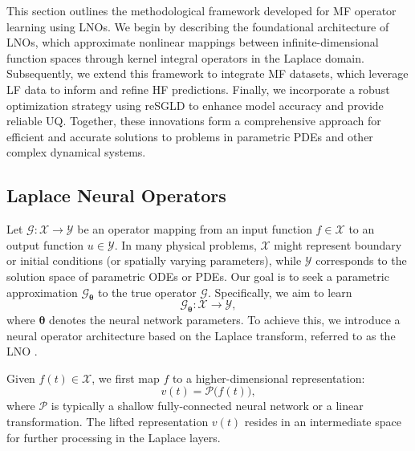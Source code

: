 
This section outlines the methodological framework developed for MF operator learning using LNOs. We begin by describing the foundational architecture of LNOs, which approximate nonlinear mappings between infinite-dimensional function spaces through kernel integral operators in the Laplace domain. Subsequently, we extend this framework to integrate MF datasets, which leverage LF data to inform and refine HF predictions. Finally, we incorporate a robust optimization strategy using reSGLD to enhance model accuracy and provide reliable UQ. Together, these innovations form a comprehensive approach for efficient and accurate solutions to problems in parametric PDEs and other complex dynamical systems.

\subsection{Laplace Neural Operators}\label{subsec:method_LNO}

Let $\mathcal{G}: \mathcal{X} \to \mathcal{Y}$ be an operator mapping from an input function $f\in\mathcal{X}$ to an output function $u\in\mathcal{Y}$. In many physical problems, $\mathcal{X}$ might represent boundary or initial conditions (or spatially varying parameters), while $\mathcal{Y}$ corresponds to the solution space of parametric ODEs or PDEs. Our goal is to seek a parametric approximation $\mathcal{G}_{\boldsymbol{\theta}}$ to the true operator $\mathcal{G}$. Specifically, we aim to learn
$$\mathcal{G}_{\boldsymbol{\theta}} : \mathcal{X} \to \mathcal{Y},$$
where ${\boldsymbol{\theta}}$ denotes the neural network parameters. To achieve this, we introduce a neural operator architecture based on the Laplace transform, referred to as the LNO \citep{cao2024laplace}.


Given $f(t) \in \mathcal{X}$, we first map $f$ to a higher-dimensional representation:
\begin{equation*}
v(t)  =  \mathcal{P}\bigl(f(t)\bigr), 
\end{equation*}
where $\mathcal{P}$ is typically a shallow fully-connected neural network or a linear transformation. The lifted representation $v(t)$ resides in an intermediate space for further processing in the Laplace layers. 

